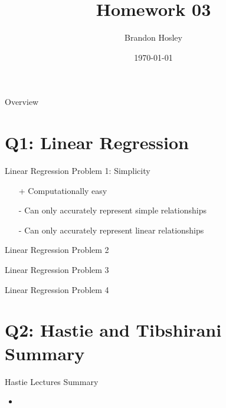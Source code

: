 \documentclass{beamer}
\title{Homework 03}
\author{Brandon Hosley}
\institute{University of Illinois - Springfield}
\date{\today}
\begin{document}
\frame{\titlepage}

\begin{frame}{Overview}
\tableofcontents
\end{frame}

\section[Q1]{Q1: Linear Regression}

\begin{frame}{Linear Regression Problem 1: Simplicity}
	\begin{itemize}
		\item[+] Computationally easy
		\item[-] Can only accurately represent simple relationships
		\item[-] Can only accurately represent linear relationships
	\end{itemize}

\end{frame}

\begin{frame}{Linear Regression Problem 2}
\end{frame}

\begin{frame}{Linear Regression Problem 3}
\end{frame}

\begin{frame}{Linear Regression Problem 4}
\end{frame}

\section[Q2]{Q2: Hastie and Tibshirani Summary}

\begin{frame}{Hastie Lectures Summary}
	\begin{itemize}
		\item 
	\end{itemize}
\end{frame}


\end{document}
